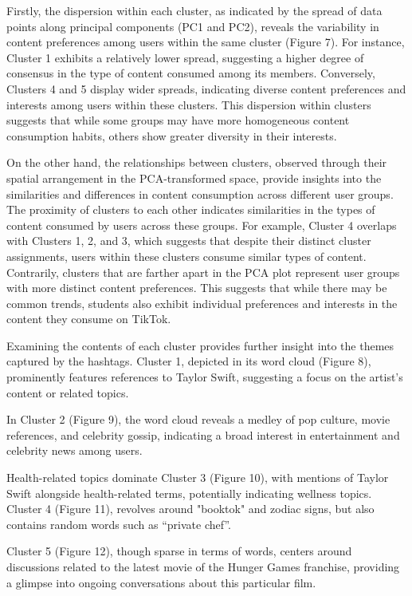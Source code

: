 \documentclass[acmtog]{acmart}
\begin{document}
Firstly, the dispersion within each cluster, as indicated by the spread of data points along principal components (PC1 and PC2), reveals the variability in content preferences among users within the same cluster (Figure 7). For instance, Cluster 1 exhibits a relatively lower spread, suggesting a higher degree of consensus in the type of content consumed among its members. Conversely, Clusters 4 and 5 display wider spreads, indicating diverse content preferences and interests among users within these clusters. This dispersion within clusters suggests that while some groups may have more homogeneous content consumption habits, others show greater diversity in their interests. 

On the other hand, the relationships between clusters, observed through their spatial arrangement in the PCA-transformed space, provide insights into the similarities and differences in content consumption across different user groups. The proximity of clusters to each other indicates similarities in the types of content consumed by users across these groups. For example, Cluster 4 overlaps with Clusters 1, 2, and 3, which suggests that despite their distinct cluster assignments, users within these clusters consume similar types of content. Contrarily, clusters that are farther apart in the PCA plot represent user groups with more distinct content preferences. This suggests that while there may be common trends, students also exhibit individual preferences and interests in the content they consume on TikTok.

Examining the contents of each cluster provides further insight into the themes captured by the hashtags. Cluster 1, depicted in its word cloud (Figure 8), prominently features references to Taylor Swift, suggesting a focus on the artist's content or related topics.

In Cluster 2 (Figure 9), the word cloud reveals a medley of pop culture, movie references, and celebrity gossip, indicating a broad interest in entertainment and celebrity news among users.

Health-related topics dominate Cluster 3 (Figure 10), with mentions of Taylor Swift alongside health-related terms, potentially indicating wellness topics. Cluster 4 (Figure 11), revolves around "booktok" and zodiac signs, but also contains random words such as “private chef”.

Cluster 5 (Figure 12), though sparse in terms of words, centers around discussions related to the latest movie of the Hunger Games franchise, providing a glimpse into ongoing conversations about this particular film.
\end{document}
